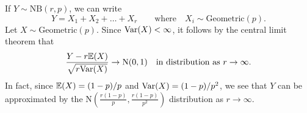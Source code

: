 \begin{exercise}
\begin{questions}
\begin{answer}
If $Y\sim\text{NB}(r,p)$, we can write
\[
Y = X_1 + X_2 + \ldots + X_r\qquad\text{where}\quad X_i\sim\text{Geometric}(p).
\]
Let $X\sim\text{Geometric}(p)$. Since $\text{Var}(X)<\infty$, it follows by the central limit theorem that 
\[
\frac{Y - r\mathbb{E}(X)}{\sqrt{r\text{Var}(X)}} \to \text{N}(0,1) \quad\text{in distribution as }r\to\infty.
\]
In fact, since $\mathbb{E}(X)=(1-p)/p$ and $\text{Var}(X)=(1-p)/p^2$, we see that $Y$ can be approximated by the 
$\displaystyle\text{N}\left(\frac{r(1-p)}{p}, \frac{r(1-p)}{p^2}\right)$ distribution as $r\to\infty$.
\end{answer}

\end{questions}
\end{exercise}

\endinput
